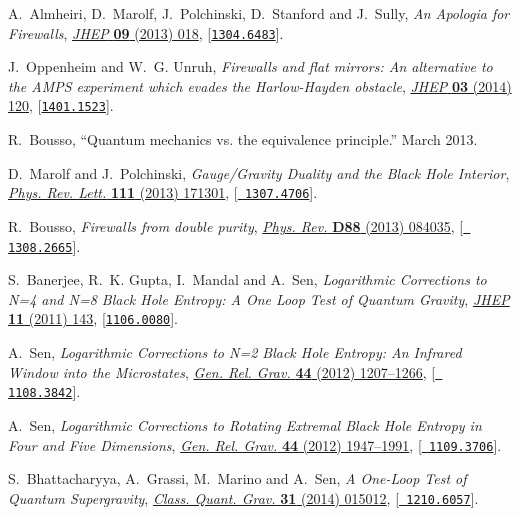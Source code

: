 \documentclass[12pt]{article}
\begin{document}
\begin{thebibliography}{100}
A.~Almheiri, D.~Marolf, J.~Polchinski, D.~Stanford and J.~Sully, \emph{{An
  Apologia for Firewalls}},
  \href{http://dx.doi.org/10.1007/JHEP09(2013)018}{\emph{JHEP} {\bf 09} (2013)
  018}, [\href{http://arxiv.org/abs/1304.6483}{{\tt 1304.6483}}].

J.~Oppenheim and W.~G. Unruh, \emph{{Firewalls and flat mirrors: An alternative
  to the AMPS experiment which evades the Harlow-Hayden obstacle}},
  \href{http://dx.doi.org/10.1007/JHEP03(2014)120}{\emph{JHEP} {\bf 03} (2014)
  120}, [\href{http://arxiv.org/abs/1401.1523}{{\tt 1401.1523}}].

R.~Bousso, ``Quantum mechanics vs. the equivalence principle.'' March 2013.

D.~Marolf and J.~Polchinski, \emph{{Gauge/Gravity Duality and the Black Hole
  Interior}},
  \href{http://dx.doi.org/10.1103/PhysRevLett.111.171301}{\emph{Phys. Rev.
  Lett.} {\bf 111} (2013) 171301}, [\href{http://arxiv.org/abs/1307.4706}{{\tt
  1307.4706}}].

R.~Bousso, \emph{{Firewalls from double purity}},
  \href{http://dx.doi.org/10.1103/PhysRevD.88.084035}{\emph{Phys. Rev.} {\bf
  D88} (2013) 084035}, [\href{http://arxiv.org/abs/1308.2665}{{\tt
  1308.2665}}].

S.~Banerjee, R.~K. Gupta, I.~Mandal and A.~Sen, \emph{{Logarithmic Corrections
  to N=4 and N=8 Black Hole Entropy: A One Loop Test of Quantum Gravity}},
  \href{http://dx.doi.org/10.1007/JHEP11(2011)143}{\emph{JHEP} {\bf 11} (2011)
  143}, [\href{http://arxiv.org/abs/1106.0080}{{\tt 1106.0080}}].

A.~Sen, \emph{{Logarithmic Corrections to N=2 Black Hole Entropy: An Infrared
  Window into the Microstates}},
  \href{http://dx.doi.org/10.1007/s10714-012-1336-5}{\emph{Gen. Rel. Grav.}
  {\bf 44} (2012) 1207--1266}, [\href{http://arxiv.org/abs/1108.3842}{{\tt
  1108.3842}}].

A.~Sen, \emph{{Logarithmic Corrections to Rotating Extremal Black Hole Entropy
  in Four and Five Dimensions}},
  \href{http://dx.doi.org/10.1007/s10714-012-1373-0}{\emph{Gen. Rel. Grav.}
  {\bf 44} (2012) 1947--1991}, [\href{http://arxiv.org/abs/1109.3706}{{\tt
  1109.3706}}].

S.~Bhattacharyya, A.~Grassi, M.~Marino and A.~Sen, \emph{{A One-Loop Test of
  Quantum Supergravity}},
  \href{http://dx.doi.org/10.1088/0264-9381/31/1/015012}{\emph{Class. Quant.
  Grav.} {\bf 31} (2014) 015012}, [\href{http://arxiv.org/abs/1210.6057}{{\tt
  1210.6057}}].


\end{thebibliography}
\end{document}
